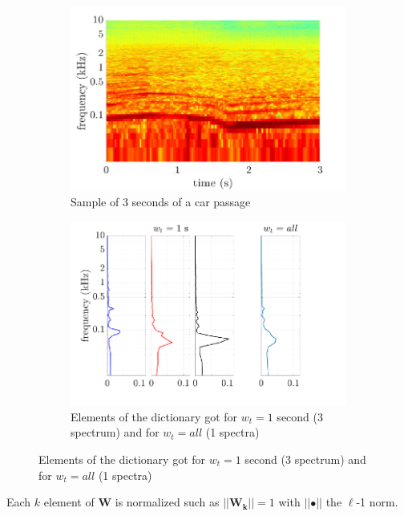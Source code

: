 \documentclass[twocolumn,a4paper,10pt]{article}
\begin{document}
\begin{figure}[t!]
    \centering
    \begin{subfigure}[t]{0.47\linewidth}
        \centering
       \includegraphics[width=\linewidth]{../image/dictionary1.pdf}
        \caption{Sample of 3 seconds of a car passage}
        \label{fig:specW}
    \end{subfigure}%
    \hfill
    \begin{subfigure}[t]{0.47\linewidth}
        \centering
       \includegraphics[width=\linewidth]{../image/dictionary2.pdf}
        \caption{Elements of the dictionary got for $w_t = 1$ second (3 spectrum) and  for $w_t = all$ (1 spectra) }
        \label{fig:ElementW}
    \end{subfigure}
\end{figure}


Each $k$ element of $\mathbf{W}$ is normalized such as $\vert \vert \mathbf{W_k} \vert \vert = 1$ with $\vert \vert \bullet \vert\vert$ the $\ell$-1 norm.\\
\end{document}
